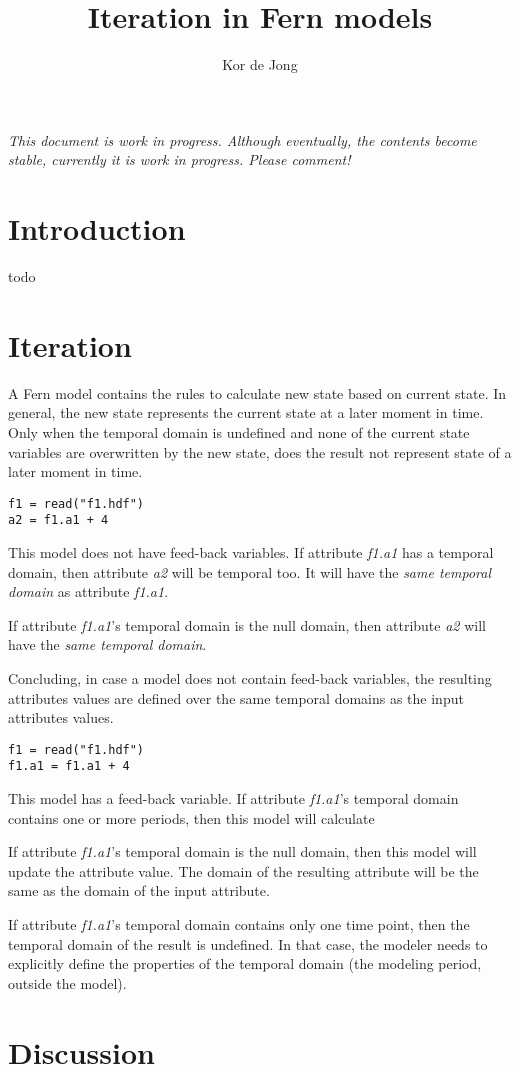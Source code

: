 \documentclass[10pt, a4paper]{article}
\begin{document}
\title{Iteration in Fern models}
\author{Kor de Jong}
\maketitle

\emph{This document is work in progress. Although eventually, the contents become stable, currently it is work in progress. Please comment!}

\section{Introduction}
todo

\section{Iteration}
A Fern model contains the rules to calculate new state based on current state. In general, the new state represents the current state at a later moment in time. Only when the temporal domain is undefined and none of the current state variables are overwritten by the new state, does the result not represent state of a later moment in time.

\begin{lstlisting}
f1 = read("f1.hdf")
a2 = f1.a1 + 4
\end{lstlisting}

This model does not have feed-back variables.
If attribute \emph{f1.a1} has a temporal domain, then attribute \emph{a2} will be temporal too. It will have the \emph{same temporal domain} as attribute \emph{f1.a1}.

If attribute \emph{f1.a1}'s temporal domain is the null domain, then attribute \emph{a2} will have the \emph{same temporal domain}.

Concluding, in case a model does not contain feed-back variables, the resulting attributes values are defined over the same temporal domains as the input attributes values.

\begin{lstlisting}
f1 = read("f1.hdf")
f1.a1 = f1.a1 + 4
\end{lstlisting}

This model has a feed-back variable.
If attribute \emph{f1.a1}'s temporal domain contains one or more periods, then this model will calculate 

If attribute \emph{f1.a1}'s temporal domain is the null domain, then this model will update the attribute value. The domain of the resulting attribute will be the same as the domain of the input attribute.

If attribute \emph{f1.a1}'s temporal domain contains only one time point, then the temporal domain of the result is undefined. In that case, the modeler needs to explicitly define the properties of the temporal domain (the modeling period, outside the model).

\section{Discussion}
\end{document}

